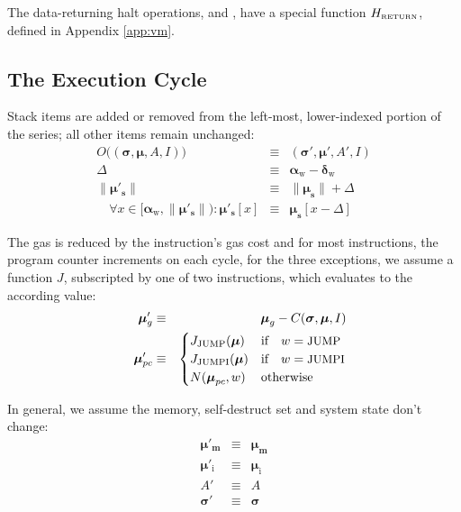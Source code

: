 \documentclass[9pt,oneside]{amsart}
\begin{document}
\begin{multicols}{2}
The data-returning halt operations,  and , have a special function $H_{\text{\tiny RETURN}}$, defined in Appendix \ref{app:vm}.

\subsection{The Execution Cycle}

Stack items are added or removed from the left-most, lower-indexed portion of the series; all other items remain unchanged:
\begin{eqnarray}
O\big((\boldsymbol{\sigma}, \boldsymbol{\mu}, A, I)\big) & \equiv & (\boldsymbol{\sigma}', \boldsymbol{\mu}', A', I) \\
\Delta & \equiv & \mathbf{\alpha}_{\mathrm{w}} - \mathbf{\delta}_{\mathrm{w}} \\
\lVert\boldsymbol{\mu}'_{\mathbf{s}}\rVert & \equiv & \lVert\boldsymbol{\mu}_{\mathbf{s}}\rVert + \Delta \\
\quad \forall x \in [\mathbf{\alpha}_{\mathrm{w}}, \lVert\boldsymbol{\mu}'_{\mathbf{s}}\rVert): \boldsymbol{\mu}'_{\mathbf{s}}[x] & \equiv & \boldsymbol{\mu}_{\mathbf{s}}[x-\Delta]
\end{eqnarray}

The gas is reduced by the instruction's gas cost and for most instructions, the program counter increments on each cycle, for the three exceptions, we assume a function $J$, subscripted by one of two instructions, which evaluates to the according value:
\begin{eqnarray}
\quad \boldsymbol{\mu}'_{g} & \equiv & \boldsymbol{\mu}_{g} - C(\boldsymbol{\sigma}, \boldsymbol{\mu}, I) \label{eq:mu_pc}\\
\quad \boldsymbol{\mu}'_{pc} & \equiv & \begin{cases}
J_{\text{JUMP}}(\boldsymbol{\mu}) & \text{if} \quad w = \text{\small JUMP} \\
J_{\text{JUMPI}}(\boldsymbol{\mu}) & \text{if} \quad w = \text{\small JUMPI} \\
N(\boldsymbol{\mu}_{pc}, w) & \text{otherwise}
\end{cases}
\end{eqnarray}

In general, we assume the memory, self-destruct set and system state don't change:
\begin{eqnarray}
\boldsymbol{\mu}'_{\mathbf{m}} & \equiv & \boldsymbol{\mu}_{\mathbf{m}} \\
\boldsymbol{\mu}'_{\mathrm{i}} & \equiv & \boldsymbol{\mu}_{\mathrm{i}} \\
A' & \equiv & A \\
\boldsymbol{\sigma}' & \equiv & \boldsymbol{\sigma}
\end{eqnarray}


\end{multicols}
\end{document}
